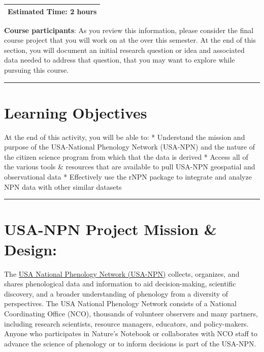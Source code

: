 \documentclass[]{book}
\begin{document}
\begin{longtable}[]{@{}l@{}}
\toprule
\endhead
Estimated Time: 2 hours\tabularnewline
\bottomrule
\end{longtable}

\leavevmode\hypertarget{ds-challenge}{}%
\textbf{Course participants}: As you review this information, please
consider the final course project
that you will work on at the over this semester. At the end of this section, you will
document an initial research question or idea and associated data needed to
address that question, that you may want to explore while pursuing this course.

\hypertarget{ds-objectives}{}
\begin{center}\rule{0.5\linewidth}{0.5pt}\end{center}

\hypertarget{learning-objectives}{%
\section{Learning Objectives}\label{learning-objectives}}

At the end of this activity, you will be able to:
* Understand the mission and purpose of the USA-National Phenology Network (USA-NPN) and the nature of the citizen science program from which that the data is derived
* Access all of the various tools \& resources that are available to pull USA-NPN geospatial and observational data
* Effectively use the rNPN package to integrate and analyze NPN data with other similar datasets

\begin{center}\rule{0.5\linewidth}{0.5pt}\end{center}

\hypertarget{usa-npn-project-mission-design}{%
\section{USA-NPN Project Mission \& Design:}\label{usa-npn-project-mission-design}}

The \href{www.usanpn.org}{USA National Phenology Network (USA-NPN)} collects, organizes, and shares phenological data and information to aid decision-making, scientific discovery, and a broader understanding of phenology from a diversity of perspectives. The USA National Phenology Network consists of a National Coordinating Office (NCO), thousands of volunteer observers and many partners, including research scientists, resource managers, educators, and policy-makers. Anyone who participates in Nature's Notebook or collaborates with NCO staff to advance the science of phenology or to inform decisions is part of the USA-NPN.
\end{document}

